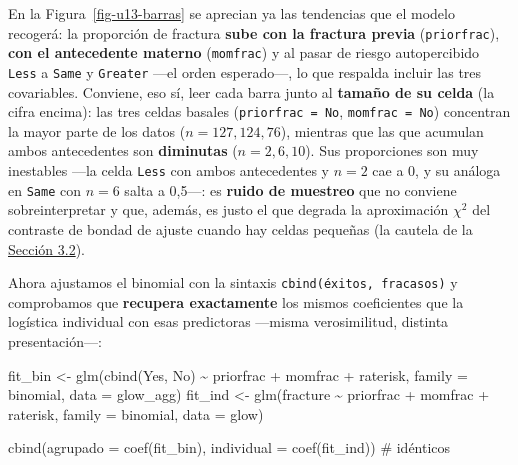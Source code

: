 \documentclass[
  letterpaper,
  DIV=11,
  numbers=noendperiod]{scrartcl}
\newenvironment{Shaded}{\begin{snugshade}}{\end{snugshade}}
\newcommand{\AttributeTok}[1]{\textcolor[rgb]{0.40,0.45,0.13}{#1}}
\newcommand{\CommentTok}[1]{\textcolor[rgb]{0.37,0.37,0.37}{#1}}
\newcommand{\FunctionTok}[1]{\textcolor[rgb]{0.28,0.35,0.67}{#1}}
\newcommand{\NormalTok}[1]{\textcolor[rgb]{0.00,0.23,0.31}{#1}}
\newcommand{\OtherTok}[1]{\textcolor[rgb]{0.00,0.23,0.31}{#1}}
\newcommand{\SpecialCharTok}[1]{\textcolor[rgb]{0.37,0.37,0.37}{#1}}
\begin{document}
En la Figura~\ref{fig-u13-barras} se aprecian ya las tendencias que el
modelo recogerá: la proporción de fractura \textbf{sube con la fractura
previa} (\texttt{priorfrac}), \textbf{con el antecedente materno}
(\texttt{momfrac}) y al pasar de riesgo autopercibido \texttt{Less} a
\texttt{Same} y \texttt{Greater} ---el orden esperado---, lo que
respalda incluir las tres covariables. Conviene, eso sí, leer cada barra
junto al \textbf{tamaño de su celda} (la cifra encima): las tres celdas
basales (\texttt{priorfrac\ =\ No}, \texttt{momfrac\ =\ No}) concentran
la mayor parte de los datos (\(n = 127, 124, 76\)), mientras que las que
acumulan ambos antecedentes son \textbf{diminutas} (\(n = 2, 6, 10\)).
Sus proporciones son muy inestables ---la celda \texttt{Less} con ambos
antecedentes y \(n=2\) cae a 0, y su análoga en \texttt{Same} con
\(n=6\) salta a 0,5---: es \textbf{ruido de muestreo} que no conviene
sobreinterpretar y que, además, es justo el que degrada la aproximación
\(\chi^2\) del contraste de bondad de ajuste cuando hay celdas pequeñas
(la cautela de la \protect\hyperlink{sec-u13-gof-binomial}{Sección
3.2}).

Ahora ajustamos el binomial con la sintaxis
\texttt{cbind(éxitos,\ fracasos)} y comprobamos que \textbf{recupera
exactamente} los mismos coeficientes que la logística individual con
esas predictoras ---misma verosimilitud, distinta presentación---:

\begin{Shaded}
\begin{Highlighting}[]
\NormalTok{fit\_bin }\OtherTok{\textless{}{-}} \FunctionTok{glm}\NormalTok{(}\FunctionTok{cbind}\NormalTok{(Yes, No) }\SpecialCharTok{\textasciitilde{}}\NormalTok{ priorfrac }\SpecialCharTok{+}\NormalTok{ momfrac }\SpecialCharTok{+}\NormalTok{ raterisk,}
               \AttributeTok{family =}\NormalTok{ binomial, }\AttributeTok{data =}\NormalTok{ glow\_agg)}
\NormalTok{fit\_ind }\OtherTok{\textless{}{-}} \FunctionTok{glm}\NormalTok{(fracture }\SpecialCharTok{\textasciitilde{}}\NormalTok{ priorfrac }\SpecialCharTok{+}\NormalTok{ momfrac }\SpecialCharTok{+}\NormalTok{ raterisk,}
               \AttributeTok{family =}\NormalTok{ binomial, }\AttributeTok{data =}\NormalTok{ glow)}

\FunctionTok{cbind}\NormalTok{(}\AttributeTok{agrupado =} \FunctionTok{coef}\NormalTok{(fit\_bin), }\AttributeTok{individual =} \FunctionTok{coef}\NormalTok{(fit\_ind))   }\CommentTok{\# idénticos}
\end{Highlighting}
\end{Shaded}
\end{document}
